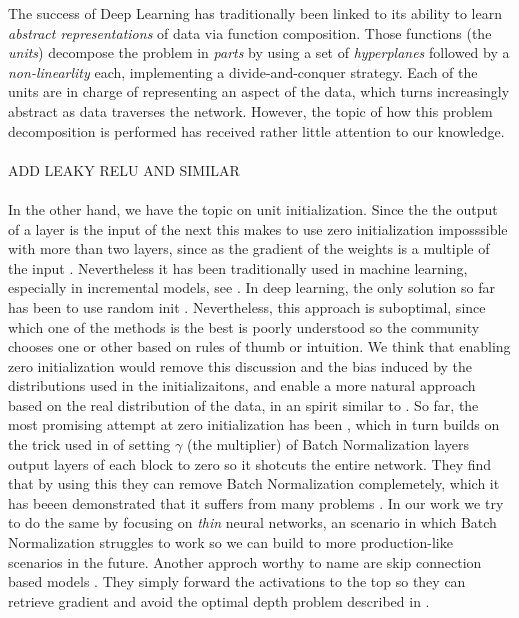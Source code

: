 The success of Deep Learning has traditionally been linked to its ability to learn \emph{abstract representations} of data via function composition\cite{LeCun06atutorial}. Those functions (the \emph{units}) decompose the problem in \emph{parts} by using a set of \emph{hyperplanes} followed by a \emph{non-linearlity} each, implementing a divide-and-conquer strategy. Each of the units are in charge of representing an aspect of the data, which turns increasingly abstract as data traverses the network. However, the topic of how this problem decomposition is performed has received rather little attention to our knowledge.
\\\\
ADD LEAKY RELU AND SIMILAR
\\\\
In the other hand, we have the topic on unit initialization. Since the the output of a layer is the input of the next this makes to use zero initialization imposssible with more than two layers, since as the gradient of the weights is a multiple of the input \cite{backprop}. Nevertheless it has been traditionally used in machine learning, especially in incremental models, see \cite{onlinesvm}\cite{adaboost}. In deep learning, the only solution so far has been to use random init \cite{xavier}\cite{he}\cite{meanfieldinit}. Nevertheless, this approach is suboptimal, since which one of the methods is the best is poorly understood so the community chooses one or other based on rules of thumb or intuition. We think that enabling zero initialization would remove this discussion and the bias induced by the distributions used in the initializaitons, and enable a more natural approach based on the real distribution of the data, in an spirit similar to \cite{magicinit}. So far, the most promising attempt at zero initialization has been \cite{fixup}, which in turn builds on the trick used in \cite{fastimangenet} of setting $\gamma$ (the multiplier) of Batch Normalization layers output layers of each block to zero so it shotcuts the entire network. They find that by using this they can remove Batch Normalization complemetely, which it has beeen demonstrated that it suffers from many problems \cite{badbatchnorm1} \cite{badbatchnorm2} \cite{groupnorm}. In our work we try to do the same by focusing on \emph{thin} neural networks, an scenario in which Batch Normalization struggles to work so we can build to more production-like scenarios in the future. Another approch worthy to name are skip connection based models \cite{resnet}\cite{densenet}. They simply forward the activations to the top so they can retrieve gradient and avoid the optimal depth problem described in \cite{resnet}\cite{resnetensemble}.\\\\

